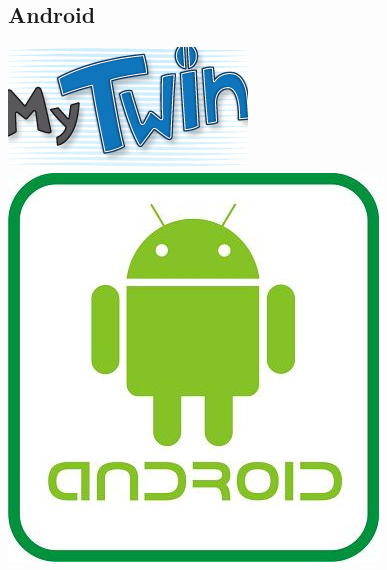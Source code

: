 \documentclass[10pt]{article}
\begin{document}
{{\begin{flushleft}
\section{Android}
\vspace{0.5in}
\begin{abstract}
\vspace{0.3in}
\large{Este es el primer trabajo de lenguajes de programaci\'on,para el cual las indicaciones fueron las de realizar un proyecto de aplicaci\'on m\'ovil, mas espec\'ifico en Android.\\
Hubieron algunas dificultades al principio, era algo nuevo para todos, a\'un no ten\'iamos clara la idea de lo que se har\'ia.\\
Entre algunas ideas, finalmente surgi\'o MY TWIN, algo que realmente nos pareci\'o novedoso y con alguna utilidad que se puede agregar a un dispositivo m\'ovil.\\
Se trabajo bastante con los recursos del tel\'efono y se hizo mucho \'enfasis en la proyecci\'on de tener un dispositivo con todo personalizado.}
\end{abstract}
\begin{center}
\vspace{0.3in}
\includegraphics[scale=0.5]{logo}\\
\vspace{0.3in}
\includegraphics[scale=0.2]{logAndroid}
\end{center}
\end{flushleft}

}}
\end{document}
